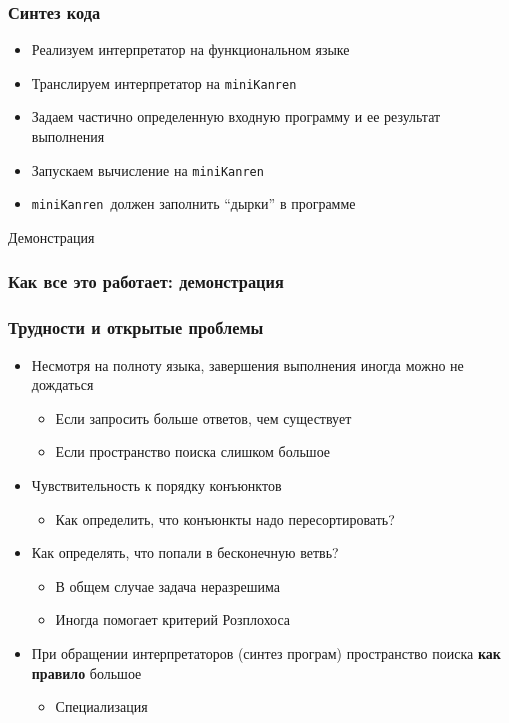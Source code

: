 \documentclass{beamer}
\newcommand{\miniKanren}{\texttt{miniKanren}}
\begin{document}
\begin{frame}[fragile]
  \transwipe[direction=90]
  \frametitle{Синтез кода}

\begin{itemize} 
  \item Реализуем интерпретатор на функциональном языке
  \item Транслируем интерпретатор на \miniKanren
  \item Задаем частично определенную входную программу и ее результат выполнения
  \item Запускаем вычисление на \miniKanren
  \item \miniKanren \ должен заполнить ``дырки'' в программе
\end{itemize}
 
 
 \vfill
 \begin{center} 
 Демонстрация
 \end{center}
\end{frame}

\begin{frame}[fragile]
  \transwipe[direction=90]
  \frametitle{Как все это работает: демонстрация}
\end{frame}

\begin{frame}[fragile]
  \transwipe[direction=90]
  \frametitle{Трудности и открытые проблемы}
  \begin{itemize}
    \item Несмотря на полноту языка, завершения выполнения иногда можно не дождаться
    \begin{itemize}
      \item Если запросить больше ответов, чем существует 
      \item Если пространство поиска слишком большое 
    \end{itemize}
    \item Чувствительность к порядку конъюнктов
    \begin{itemize}
      \item Как определить, что конъюнкты надо пересортировать? 
    \end{itemize}
    \item Как определять, что попали в бесконечную ветвь? 
    \begin{itemize}
      \item В общем случае задача неразрешима
      \item Иногда помогает критерий Розплохоса 
    \end{itemize}
    \item При обращении интерпретаторов (синтез програм) пространство поиска \textbf{как правило} большое
    \begin{itemize}
      \item Специализация
    \end{itemize}
  \end{itemize}
  
\end{frame}
\end{document}
